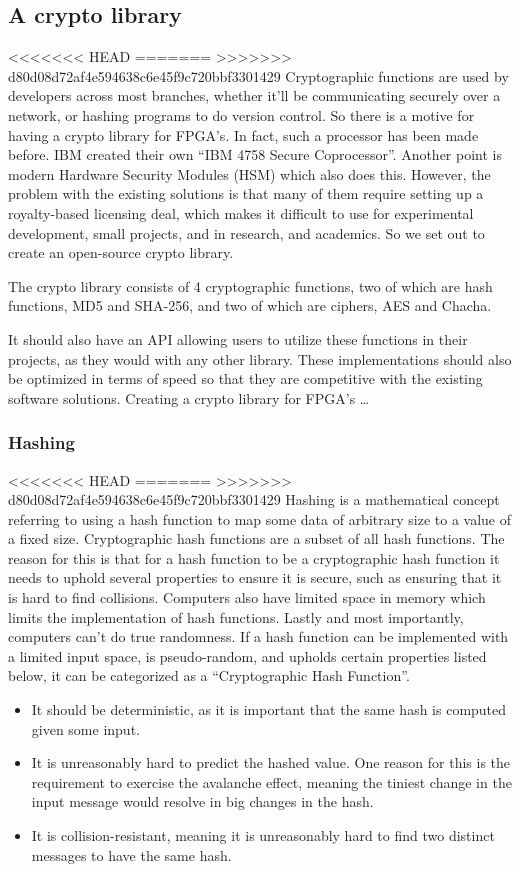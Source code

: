 \documentclass[a4paper]{article}
\begin{document}
\subsection{A crypto library}
<<<<<<< HEAD
\label{sec:orgb31e666}
=======
\label{sec:orgc5aa1b3}
>>>>>>> d80d08d72af4e594638c6e45f9c720bbf3301429
Cryptographic functions are used by developers across most branches, whether it'll be communicating securely over a network, or hashing programs to do version control.
So there is a motive for having a crypto library for FPGA's. In fact, such a processor has been made before. IBM created their own ``IBM 4758 Secure Coprocessor''\cite{IBM4758}. Another point is modern Hardware Security Modules (HSM) which also does this.
However, the problem with the existing solutions is that many of them require setting up a royalty-based licensing deal, which makes it difficult to use for experimental development, small projects, and in research, and academics.
So we set out to create an open-source crypto library.

The crypto library consists of 4 cryptographic functions, two of which are hash functions, MD5 and SHA-256, and two of which are ciphers, AES and Chacha.

It should also have an API allowing users to utilize these functions in their projects, as they would with any other library.
These implementations should also be optimized in terms of speed so that they are competitive with the existing software solutions.
Creating a crypto library for FPGA's \ldots{}

\subsubsection{Hashing}
<<<<<<< HEAD
\label{sec:orge7ac32f}
=======
\label{sec:orgd281389}
>>>>>>> d80d08d72af4e594638c6e45f9c720bbf3301429
Hashing is a mathematical concept referring to using a hash function to map some data of arbitrary size to a value of a fixed size. Cryptographic hash functions are a subset of all hash functions.
The reason for this is that for a hash function to be a cryptographic hash function it needs to uphold several properties to ensure it is secure, such as ensuring that it is hard to find collisions. Computers also have limited space in memory which limits the implementation of hash functions. Lastly and most importantly, computers can't do true randomness.
If a hash function can be implemented with a limited input space, is pseudo-random, and upholds certain properties listed below, it can be categorized as a ``Cryptographic Hash Function''.
\begin{itemize}
\item It should be deterministic, as it is important that the same hash is computed given some input.
\item It is unreasonably hard to predict the hashed value. One reason for this is the requirement to exercise the avalanche effect, meaning the tiniest change in the input message would resolve in big changes in the hash.
\item It is collision-resistant, meaning it is unreasonably hard to find two distinct messages to have the same hash.
\end{itemize}
\end{document}
